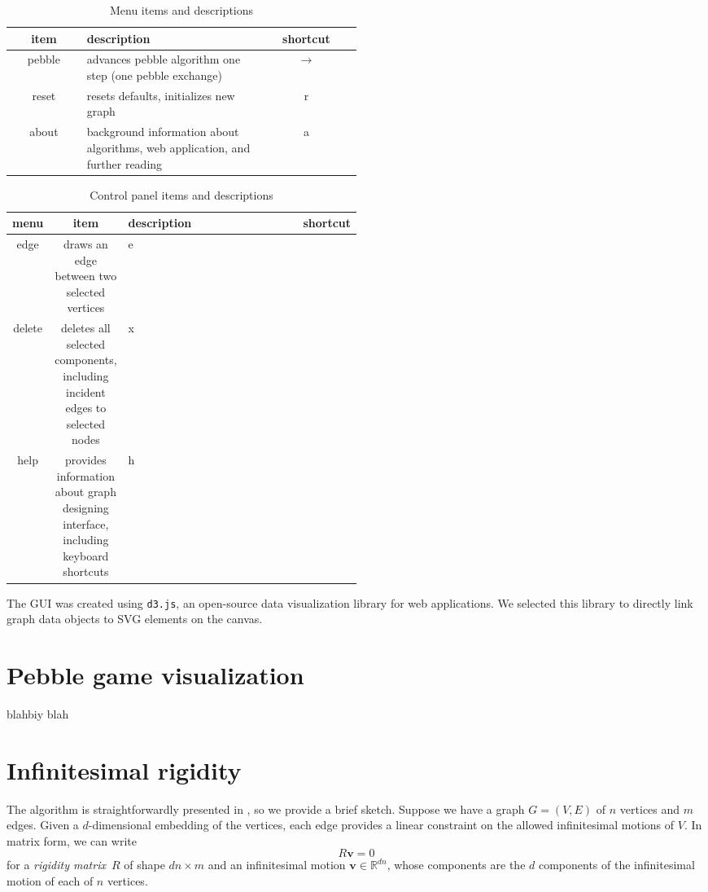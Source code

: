 \documentclass[aps,final,twocolumn,letterpaper,nofootinbib]{revtex4-1}
\newcommand\RR{\mathbb{R}}
\newcommand{\mb}{\mathbf}
\begin{document}
\begin{table}[ht]
\caption{Menu items and descriptions}
\begin{tabular}{c | p{0.5\linewidth} | c}
item & description & shortcut \\ \hline
pebble & advances pebble algorithm one step
(one pebble exchange) & $\to$\\
reset & resets defaults, initializes new graph & r \\
about & background information about algorithms,
web application, and further reading & a \\
\end{tabular}
\label{tab:menu}
\end{table}

\begin{table}[ht]
\caption{Control panel items and descriptions}
\begin{tabular}{c c | p{0.5\linewidth} | c}
\multirow{3}{*}{menu} &
item & description & shortcut \\ \hline
edge & draws an edge between two selected vertices & e\\
delete & deletes all selected components, including incident edges
to selected nodes & x \\
help & provides information about graph designing interface,
including keyboard shortcuts & h \\
\end{tabular}
\label{tab:ctrl}
\end{table}

The GUI was created using \texttt{d3.js},
an open-source data visualization library for web applications.
We selected this library
to directly link graph data objects to SVG elements on the canvas.

\section{Pebble game visualization}

blahbiy blah
\section{Infinitesimal rigidity}

The algorithm is straightforwardly presented in \cite[\S4.4.2]{gfalop},
so we provide a brief sketch.
Suppose we have a graph $G = (V, E)$ of $n$ vertices and $m$ edges.
Given a $d$-dimensional embedding of the vertices,
each edge provides a linear constraint
on the allowed infinitesimal motions of $V$.
In matrix form, we can write
\begin{equation}
    R\mb v = 0
\end{equation}
for a \emph{rigidity matrix}~$R$ of shape $dn \times m$
and an infinitesimal motion $\mb v \in \RR^{dn}$,
whose components are the $d$ components
of the infinitesimal motion of each of $n$ vertices.
\end{document}

